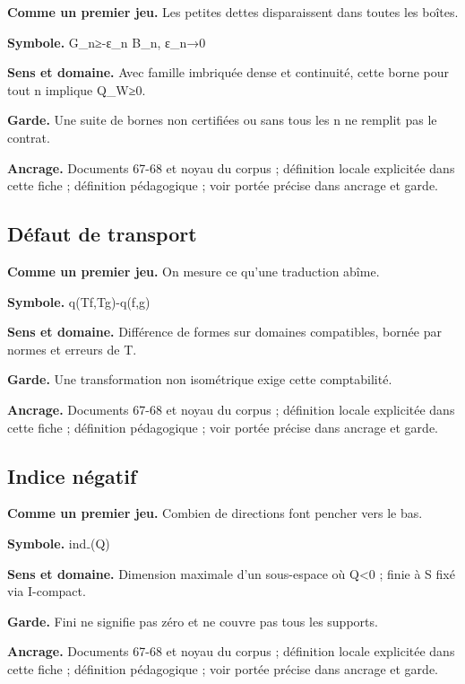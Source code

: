 \documentclass[
  9pt,
  a4paper,
]{article}
\begin{document}
\textbf{Comme un premier jeu.} Les petites dettes disparaissent dans
toutes les boîtes.

\textbf{Symbole.} G\_n≥-ε\_n B\_n, ε\_n→0

\textbf{Sens et domaine.} Avec famille imbriquée dense et continuité,
cette borne pour tout n implique Q\_W≥0.

\textbf{Garde.} Une suite de bornes non certifiées ou sans tous les n ne
remplit pas le contrat.

\textbf{Ancrage.} Documents 67-68 et noyau du corpus ; définition locale
explicitée dans cette fiche ; définition pédagogique ; voir portée
précise dans ancrage et garde.

\hypertarget{duxe9faut-de-transport}{%
\subsection{Défaut de transport}\label{duxe9faut-de-transport}}

\textbf{Comme un premier jeu.} On mesure ce qu'une traduction abîme.

\textbf{Symbole.} \textbar q(Tf,Tg)-q(f,g)\textbar{}

\textbf{Sens et domaine.} Différence de formes sur domaines compatibles,
bornée par normes et erreurs de T.

\textbf{Garde.} Une transformation non isométrique exige cette
comptabilité.

\textbf{Ancrage.} Documents 67-68 et noyau du corpus ; définition locale
explicitée dans cette fiche ; définition pédagogique ; voir portée
précise dans ancrage et garde.

\hypertarget{indice-nuxe9gatif}{%
\subsection{Indice négatif}\label{indice-nuxe9gatif}}

\textbf{Comme un premier jeu.} Combien de directions font pencher vers
le bas.

\textbf{Symbole.} ind₋(Q)

\textbf{Sens et domaine.} Dimension maximale d'un sous-espace où
Q\textless0 ; finie à S fixé via I-compact.

\textbf{Garde.} Fini ne signifie pas zéro et ne couvre pas tous les
supports.

\textbf{Ancrage.} Documents 67-68 et noyau du corpus ; définition locale
explicitée dans cette fiche ; définition pédagogique ; voir portée
précise dans ancrage et garde.
\end{document}
